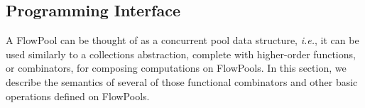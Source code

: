 



\vspace{-0.3cm}
\subsection{Programming Interface}
\label{sec:programming-interface}

A FlowPool can be thought of as a concurrent pool data structure,
\textit{i.e.}, it can be used similarly to a collections abstraction, complete
with higher-order functions, or combinators, for composing computations on
FlowPools. In this section, we describe the semantics of several of those
functional combinators  and other basic operations defined on FlowPools.

